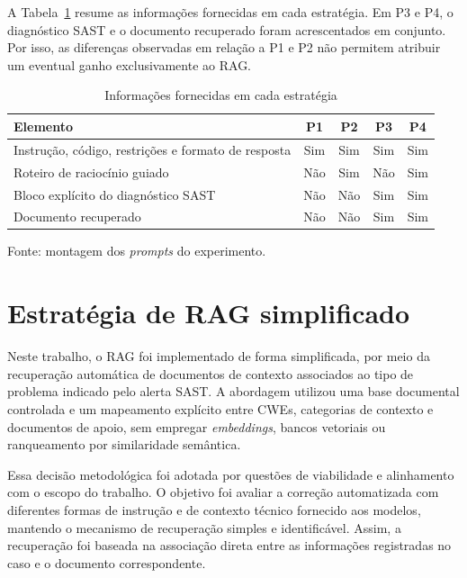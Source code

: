 A Tabela~\ref{tab:estrategias} resume as informações fornecidas em cada estratégia. Em P3 e P4, o diagnóstico SAST e o documento recuperado foram acrescentados em conjunto. Por isso, as diferenças observadas em relação a P1 e P2 não permitem atribuir um eventual ganho exclusivamente ao RAG.

\begin{table}[H]
\centering
\caption{Informações fornecidas em cada estratégia}
\label{tab:estrategias}
\renewcommand{\arraystretch}{1.35}
\begin{tabularx}{\textwidth}{|>{\raggedright\arraybackslash}X|c|c|c|c|}
\hline
\textbf{Elemento} & \textbf{P1} & \textbf{P2} & \textbf{P3} & \textbf{P4} \\
\hline
Instrução, código, restrições e formato de resposta & Sim & Sim & Sim & Sim \\
\hline
Roteiro de raciocínio guiado & Não & Sim & Não & Sim \\
\hline
Bloco explícito do diagnóstico SAST & Não & Não & Sim & Sim \\
\hline
Documento recuperado & Não & Não & Sim & Sim \\
\hline
\end{tabularx}

\vspace{0.2cm}
\begin{minipage}{\textwidth}
    \footnotesize
    Fonte: montagem dos \textit{prompts} do experimento.
\end{minipage}
\end{table}

\section{Estratégia de RAG simplificado}
\label{sec:met-rag}

Neste trabalho, o RAG foi implementado de forma simplificada, por meio da recuperação automática de documentos de contexto associados ao tipo de problema indicado pelo alerta SAST. A abordagem utilizou uma base documental controlada e um mapeamento explícito entre CWEs, categorias de contexto e documentos de apoio, sem empregar \textit{embeddings}, bancos vetoriais ou ranqueamento por similaridade semântica.

Essa decisão metodológica foi adotada por questões de viabilidade e alinhamento com o escopo do trabalho. O objetivo foi avaliar a correção automatizada com diferentes formas de instrução e de contexto técnico fornecido aos modelos, mantendo o mecanismo de recuperação simples e identificável. Assim, a recuperação foi baseada na associação direta entre as informações registradas no caso e o documento correspondente.

